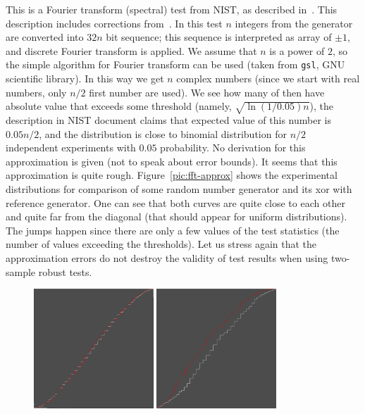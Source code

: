 \documentclass[12pt,a4paper,fullpage]{article}
\begin{document}
\begin{description}
This is a Fourier transform (spectral) test from NIST, as described in~\cite{nistsp800-22-1a}. This description includes corrections from~\cite{kim-umeno-hasegawa}. In this test $n$ integers from the generator are converted into $32n$ bit sequence; this sequence is interpreted as array of $\pm 1$, and discrete Fourier transform is applied. We assume that $n$ is a power of $2$, so the simple algorithm for Fourier transform can be used (taken from \texttt{gsl}, GNU scientific library). In this way we get $n$ complex numbers (since we start with real numbers, only $n/2$ first number are used). We see how many of then have absolute value that exceeds some threshold (namely, $\sqrt{\ln(1/0.05)n}$), the description in NIST document claims that expected value of this number is $0.05n/2$, and the distribution is close to binomial distribution for $n/2$ independent experiments with $0.05$ probability. No derivation for this approximation is given (not to speak about error bounds). It seems that this approximation is quite rough. Figure~\ref{pic:fft-approx} shows the experimental distributions for comparison of some random number generator and its xor with reference generator. One can see that both curves are quite close to each other and quite far from the diagonal (that should appear for uniform distributions). The jumps happen since there are only a few values of the test statistics (the number of values exceeding the thresholds). Let us stress again that the approximation errors do not destroy the validity of test results when using two-sample robust tests.
\begin{figure}[t]
\begin{center}
\includegraphics[width=0.4\textwidth]{pdfs/fft-approx.pdf}\qquad
\includegraphics[width=0.4\textwidth]{pdfs/fft-differ.pdf}

\end{center}
\end{figure}
\end{description}
\end{document}
